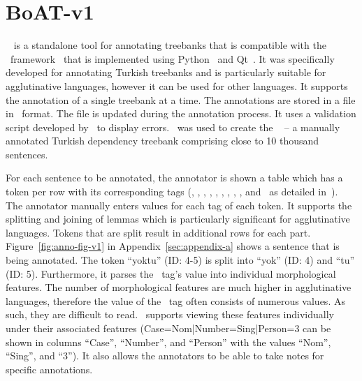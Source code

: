 \section{BoAT-v1}
\label{sec:boatvone}

\boatvone~\cite{turk-etal-2019-turkish} is a standalone tool for annotating treebanks that is compatible with the \ud\ framework~\cite{UD} that is implemented using Python~\cite{python} and Qt~\cite{qt}.
It was specifically developed for annotating Turkish treebanks and is particularly suitable for agglutinative languages, however it can be used for other languages.
It supports the annotation of a single treebank at a time.
The annotations are stored in a file in \conllu\ format.
The file is updated during the annotation process.
It uses a validation script developed by \ud\ to display errors.
\boatvone\ was used to create the \bountreebank~\cite{turk2021resources,UD-Boun-Treebank} -- a manually annotated Turkish dependency treebank comprising close to 10 thousand sentences.

For each sentence to be annotated, the annotator is shown a table which has a token per row with its corresponding tags (\id, \form, \lemma, \upos, \xpos, \feats, \head, \deprel, \deps, and \misc\ as detailed in~\cite{turk-etal-2019-turkish}).
The annotator manually enters values for each tag of each token.
It supports the splitting and joining of lemmas which is particularly significant for agglutinative languages.
Tokens that are split result in additional rows for each part.
Figure~\ref{fig:anno-fig-v1} in Appendix~\ref{sec:appendix-a} shows a sentence that is being annotated.
The token ``yoktu'' (ID: 4-5) is split into ``yok'' (ID: 4) and ``tu'' (ID: 5). 
Furthermore, it parses the \feats\ tag's value into individual morphological features.
The number of morphological features are much higher in agglutinative languages, therefore the value of the \feats\ tag often consists of numerous values.
As such, they are difficult to read.
\boatvone\ supports viewing these features individually under their associated features (Case=Nom|Number=Sing|Person=3 can be shown in columns ``Case'', ``Number'', and ``Person'' with the values ``Nom'', ``Sing'', and ``3'').
It also allows the annotators to be able to take notes for specific annotations.
